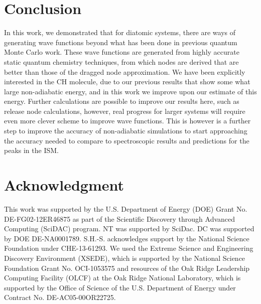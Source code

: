 \documentclass[aip,jcp,numerical,reprint]{revtex4-1}
\begin{document}

\section{Conclusion}

In this work, we demonstrated that for diatomic systems, there are ways of generating wave functions beyond what has been done in previous quantum Monte Carlo work.  These wave functions are generated from highly accurate static quantum chemistry techniques, from which nodes are derived that are better than those of the dragged node approximation.  We have been explicitly interested in the CH molecule, due to our previous results that show some what large non-adiabatic energy, and in this work we improve upon our estimate of this energy.  Further calculations are possible to improve our results here, such as release node calculations, however, real progress for larger systems will require even more clever scheme to improve wave functions.   This is however is a further step to improve the accuracy of non-adiabatic simulations to start approaching the accuracy needed to compare to spectroscopic results and predictions for the peaks in the ISM.


\section{Acknowledgment}
 This work was supported by the U.S. Department of Energy (DOE) Grant No. DE-FG02-12ER46875 as part of the Scientific Discovery through Advanced Computing (SciDAC) program. NT was supported by SciDac.   DC was supported by DOE DE-NA0001789. S.H.-S. acknowledges support by the National Science Foundation under CHE-13-61293.  We used the Extreme Science and Engineering Discovery Environment (XSEDE), which is supported by the National Science Foundation Grant No. OCI-1053575 and resources of the Oak Ridge Leadership Computing Facility (OLCF) at the Oak Ridge National Laboratory, which is supported by the Office of Science of the U.S. Department of Energy under Contract No. DE-AC05-00OR22725.


\end{document}
